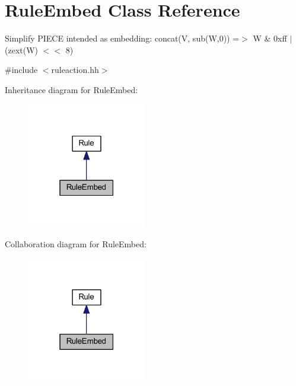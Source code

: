 \hypertarget{class_rule_embed}{}\section{Rule\+Embed Class Reference}
\label{class_rule_embed}


Simplify P\+I\+E\+CE intended as embedding\+: {\ttfamily concat(\+V, sub(\+W,0)) =$>$ W \& 0xff $\vert$ (zext(\+W) $<$$<$ 8)}  




{\ttfamily \#include $<$ruleaction.\+hh$>$}



Inheritance diagram for Rule\+Embed\+:
\nopagebreak
\begin{figure}[H]
\begin{center}
\leavevmode
\includegraphics[width=147pt]{class_rule_embed__inherit__graph}
\end{center}
\end{figure}


Collaboration diagram for Rule\+Embed\+:
\nopagebreak
\begin{figure}[H]
\begin{center}
\leavevmode
\includegraphics[width=147pt]{class_rule_embed__coll__graph}
\end{center}
\end{figure}
